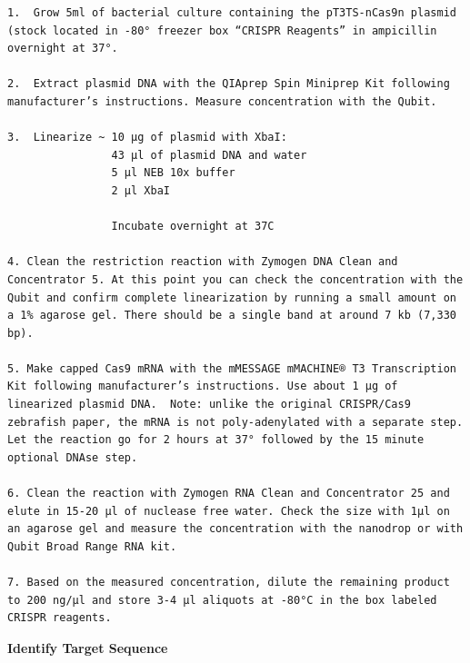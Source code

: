\documentclass[
  letterpaper,
  DIV=11,
  numbers=noendperiod]{scrreprt}
\begin{document}
\begin{verbatim}
1.  Grow 5ml of bacterial culture containing the pT3TS-nCas9n plasmid (stock located in -80° freezer box “CRISPR Reagents” in ampicillin overnight at 37°.  

2.  Extract plasmid DNA with the QIAprep Spin Miniprep Kit following manufacturer’s instructions. Measure concentration with the Qubit. 

3.  Linearize ~ 10 µg of plasmid with XbaI: 
                43 µl of plasmid DNA and water 
                5 µl NEB 10x buffer 
                2 µl XbaI 
                          
                Incubate overnight at 37C 

4. Clean the restriction reaction with Zymogen DNA Clean and Concentrator 5. At this point you can check the concentration with the Qubit and confirm complete linearization by running a small amount on a 1% agarose gel. There should be a single band at around 7 kb (7,330 bp). 

5. Make capped Cas9 mRNA with the mMESSAGE mMACHINE® T3 Transcription Kit following manufacturer’s instructions. Use about 1 µg of linearized plasmid DNA.  Note: unlike the original CRISPR/Cas9 zebrafish paper, the mRNA is not poly-adenylated with a separate step. Let the reaction go for 2 hours at 37° followed by the 15 minute optional DNAse step. 

6. Clean the reaction with Zymogen RNA Clean and Concentrator 25 and elute in 15-20 µl of nuclease free water. Check the size with 1µl on an agarose gel and measure the concentration with the nanodrop or with Qubit Broad Range RNA kit. 

7. Based on the measured concentration, dilute the remaining product to 200 ng/µl and store 3-4 µl aliquots at -80°C in the box labeled CRISPR reagents.  
\end{verbatim}

\textbf{Identify Target Sequence}
\end{document}
